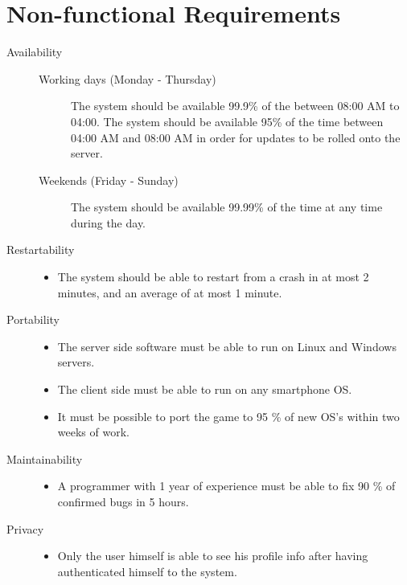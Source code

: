 \section{Non-functional Requirements}

\begin{description}

\item [Availability] \hfill 
	\begin{description}
		\item[Working days (Monday - Thursday)] The system should be available 99.9\% of the between 08:00 AM to 04:00. The system should be available 95\% of the time between 04:00 AM and 08:00 AM in order for updates to be rolled onto the server.
		\item[Weekends (Friday - Sunday)] The system should be available 99.99\% of the time at any time during the day. 
	\end{description}

\item [Restartability] \hfill 
	\begin{itemize}
	   \item The system should be able to restart from a crash in at most 2 minutes, and an average of at most 1 minute.
	\end{itemize}

\item [Portability] \hfill 
	\begin{itemize}
		\item The server side software must be able to run on Linux and Windows servers.
		\item The client side must be able to run on any smartphone OS.
		\item It must be possible to port the game to 95 \% of new OS's within two weeks of work.
	\end{itemize}

\item [Maintainability] \hfill 
	\begin{itemize}
	  	\item A programmer with 1 year of experience must be able to fix 90 \% of confirmed bugs in 5 hours.
	\end{itemize}



\item [Privacy] \hfill 
	\begin{itemize}
		\item Only the user himself is able to see his profile info after having authenticated himself to the system.
	\end{itemize}


\end{description}
